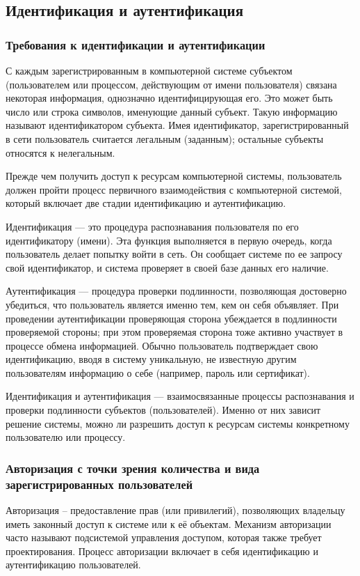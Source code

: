 \documentclass[a4paper,12pt]{extarticle}
\begin{document}
	\subsection{Идентификация и аутентификация}
	
	\subsubsection{Требования к идентификации и аутентификации}
	С каждым зарегистрированным в компьютерной системе субъектом (пользователем или процессом, действующим от имени пользователя) связана некоторая информация, однозначно идентифицирующая его. Это может быть число или строка символов, именующие данный субъект. Такую информацию называют идентификатором субъекта. Имея идентификатор, зарегистрированный в сети пользователь считается легальным (заданным); остальные субъекты относятся к нелегальным.
	
	Прежде чем получить доступ к ресурсам компьютерной системы, пользователь должен пройти процесс первичного взаимодействия с компьютерной системой, который включает две стадии идентификацию и аутентификацию.
	
	Идентификация — это процедура распознавания пользователя по его идентификатору (имени). Эта функция выполняется в первую очередь, когда пользователь делает попытку войти в сеть. Он сообщает системе по ее запросу свой идентификатор, и система проверяет в своей базе данных его наличие.
	
	Аутентификация — процедура проверки подлинности, позволяющая достоверно убедиться, что пользователь является именно тем, кем он себя объявляет. При проведении аутентификации проверяющая сторона убеждается в подлинности проверяемой стороны; при этом проверяемая сторона тоже активно участвует в процессе обмена информацией. Обычно пользователь подтверждает свою идентификацию, вводя в систему уникальную, не известную другим пользователям информацию о себе (например, пароль или сертификат).
	
	Идентификация и аутентификация — взаимосвязанные процессы распознавания и проверки подлинности субъектов (пользователей). Именно от них зависит решение системы, можно ли разрешить доступ к ресурсам системы конкретному пользователю или процессу. 
	\subsubsection{Авторизация с точки зрения количества и вида зарегистрированных пользователей}
	Авторизация – предоставление прав (или привилегий), позволяющих владельцу иметь законный доступ к системе или к её объектам. Механизм авторизации часто называют подсистемой управления доступом, которая также требует проектирования. Процесс авторизации включает в себя идентификацию и аутентификацию пользователей.
	
\end{document}
